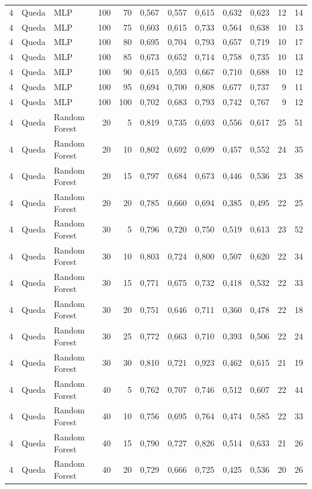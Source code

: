 \begin{longtable}{@{}rllrrrrrrrrr@{}}
4 & Queda & MLP & 100 & 70 & 0,567 & 0,557 & 0,615 & 0,632 & 0,623 & 12 & 14 \\
4 & Queda & MLP & 100 & 75 & 0,603 & 0,615 & 0,733 & 0,564 & 0,638 & 10 & 13 \\
4 & Queda & MLP & 100 & 80 & 0,695 & 0,704 & 0,793 & 0,657 & 0,719 & 10 & 17 \\
4 & Queda & MLP & 100 & 85 & 0,673 & 0,652 & 0,714 & 0,758 & 0,735 & 10 & 13 \\
4 & Queda & MLP & 100 & 90 & 0,615 & 0,593 & 0,667 & 0,710 & 0,688 & 10 & 12 \\
4 & Queda & MLP & 100 & 95 & 0,694 & 0,700 & 0,808 & 0,677 & 0,737 & 9 & 11 \\
4 & Queda & MLP & 100 & 100 & 0,702 & 0,683 & 0,793 & 0,742 & 0,767 & 9 & 12 \\
4 & Queda & Random Forest & 20 & 5 & 0,819 & 0,735 & 0,693 & 0,556 & 0,617 & 25 & 51 \\
4 & Queda & Random Forest & 20 & 10 & 0,802 & 0,692 & 0,699 & 0,457 & 0,552 & 24 & 35 \\
4 & Queda & Random Forest & 20 & 15 & 0,797 & 0,684 & 0,673 & 0,446 & 0,536 & 23 & 38 \\
4 & Queda & Random Forest & 20 & 20 & 0,785 & 0,660 & 0,694 & 0,385 & 0,495 & 22 & 25 \\
4 & Queda & Random Forest & 30 & 5 & 0,796 & 0,720 & 0,750 & 0,519 & 0,613 & 23 & 52 \\
4 & Queda & Random Forest & 30 & 10 & 0,803 & 0,724 & 0,800 & 0,507 & 0,620 & 22 & 34 \\
4 & Queda & Random Forest & 30 & 15 & 0,771 & 0,675 & 0,732 & 0,418 & 0,532 & 22 & 33 \\
4 & Queda & Random Forest & 30 & 20 & 0,751 & 0,646 & 0,711 & 0,360 & 0,478 & 22 & 18 \\
4 & Queda & Random Forest & 30 & 25 & 0,772 & 0,663 & 0,710 & 0,393 & 0,506 & 22 & 24 \\
4 & Queda & Random Forest & 30 & 30 & 0,810 & 0,721 & 0,923 & 0,462 & 0,615 & 21 & 19 \\
4 & Queda & Random Forest & 40 & 5 & 0,762 & 0,707 & 0,746 & 0,512 & 0,607 & 22 & 44 \\
4 & Queda & Random Forest & 40 & 10 & 0,756 & 0,695 & 0,764 & 0,474 & 0,585 & 22 & 33 \\
4 & Queda & Random Forest & 40 & 15 & 0,790 & 0,727 & 0,826 & 0,514 & 0,633 & 21 & 26 \\
4 & Queda & Random Forest & 40 & 20 & 0,729 & 0,666 & 0,725 & 0,425 & 0,536 & 20 & 26 \\

\end{longtable}
